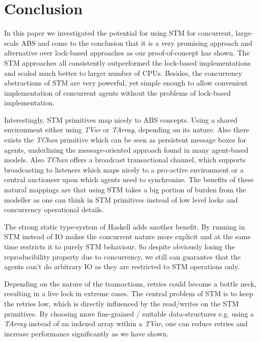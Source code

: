 \section{Conclusion} %
\label{sec:conclusion}

In this paper we investigated the potential for using STM for concurrent, large-scale ABS and come to the conclusion that it is a very promising approach and alternative over lock-based approaches as our proof-of-concept has shown. The STM approaches all consistently outperformed the lock-based implementations and scaled much better to larger number of CPUs. Besides, the concurrency abstractions of STM are very powerful, yet simple enough to allow convenient implementation of concurrent agents without the problems of lock-based implementation.

Interestingly, STM primitives map nicely to ABS concepts. Using a shared environment either using \textit{TVar} or \textit{TArray}, depending on its nature.  Also there exists the \textit{TChan} primitive which can be seen as persistent message boxes for agents, underlining the message-oriented approach found in many agent-based models. Also \textit{TChan} offers a broadcast transactional channel, which supports broadcasting to listeners which maps nicely to a pro-active environment or a central auctioneer upon which agents need to synchronize. The benefits of these natural mappings are that using STM takes a big portion of burden from the modeller as one can think in STM primitives instead of low level locks and concurrency operational details.

The strong static type-system of Haskell adds another benefit. By running in STM instead of IO makes the concurrent nature more explicit and at the same time restricts it to purely STM behaviour. So despite obviously losing the reproducibility property due to concurrency, we still can guarantee that the agents can't do arbitrary IO as they are restricted to STM operations only.

Depending on the nature of the transactions, retries could become a bottle neck, resulting in a live lock in extreme cases. The central problem of STM is to keep the retries low, which is directly influenced by the read/writes on the STM primitives. By choosing more fine-grained / suitable data-structures e.g. using a \textit{TArray} instead of an indexed array within a \textit{TVar}, one can reduce retries and increase performance significantly as we have shown.

